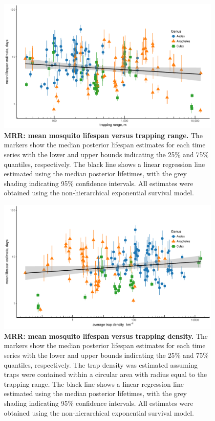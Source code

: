 \documentclass[12pt]{article}
\begin{document}
\begin{figure}[h]
	\centerline{\includegraphics[width=1\textwidth]{./Figure_files/mrr_lifeSpanVsRange.pdf}}
	\caption{\textbf{MRR: mean mosquito lifespan versus trapping range.} The markers show the median posterior lifespan estimates for each time series with the lower and upper bounds indicating the 25\% and 75\% quantiles, respectively. The black line shows a linear regression line estimated using the median posterior lifetimes, with the grey shading indicating 95\% confidence intervals. All estimates were obtained using the non-hierarchical exponential survival model.}
	\label{fig:mrr_lifeSpanVsRange}
\end{figure}

\begin{figure}[h]
	\centerline{\includegraphics[width=1\textwidth]{./Figure_files/mrr_lifespanVsTrapDensity.pdf}}
	\caption{\textbf{MRR: mean mosquito lifespan versus trapping density.} The markers show the median posterior lifespan estimates for each time series with the lower and upper bounds indicating the 25\% and 75\% quantiles, respectively. The trap density was estimated assuming traps were contained within a circular area with radius equal to the trapping range. The black line shows a linear regression line estimated using the median posterior lifetimes, with the grey shading indicating 95\% confidence intervals. All estimates were obtained using the non-hierarchical exponential survival model.}
	\label{fig:mrr_lifeSpanVsTrapDensity}
\end{figure}
\end{document}

